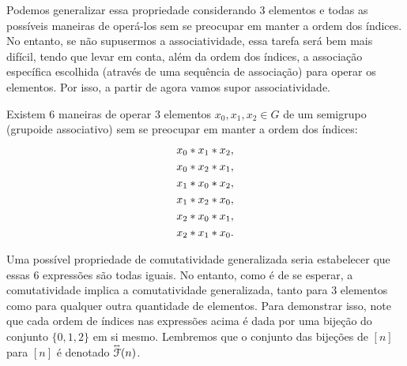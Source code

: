 Podemos generalizar essa propriedade considerando $3$ elementos e todas as possíveis maneiras de operá-los sem se preocupar em manter a ordem dos índices. No entanto, se não supusermos a associatividade, essa tarefa será bem mais difícil, tendo que levar em conta, além da ordem dos índices, a associação específica escolhida (através de uma sequência de associação) para operar os elementos. Por isso, a partir de agora vamos supor associatividade.

Existem $6$ maneiras de operar $3$ elementos $x_0, x_1, x_2 \in G$ de um semigrupo (grupoide associativo) sem se preocupar em manter a ordem dos índices:
	\begin{align*}
	& x_0 \ast x_1 \ast x_2, \\
	& x_0 \ast x_2 \ast x_1, \\
	& x_1 \ast x_0 \ast x_2, \\
	& x_1 \ast x_2 \ast x_0, \\
	& x_2 \ast x_0 \ast x_1, \\
	& x_2 \ast x_1 \ast x_0.
	\end{align*}

Uma possível propriedade de comutatividade generalizada seria estabelecer que essas $6$ expressões são todas iguais. No entanto, como é de se esperar, a comutatividade implica a comutatividade generalizada, tanto para $3$ elementos como para qualquer outra quantidade de elementos. Para demonstrar isso, %
note que cada ordem de índices nas expressões acima é dada por uma bijeção do conjunto $\{0,1,2\}$ em si mesmo. Lembremos que o conjunto das bijeções de $[n]$ para $[n]$ é denotado $\accentset{\leftrightarrow}{\mathcal{F}}(n)$.


